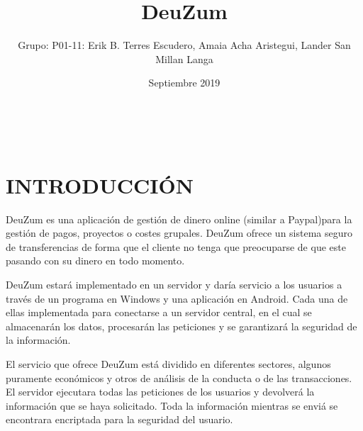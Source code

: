 \documentclass{article}
\title{ DeuZum}
\author{Grupo: P01-11: Erik B. Terres Escudero, Amaia Acha Aristegui, Lander San Millan Langa}
\date{Septiembre 2019}
\theoremstyle{definition}
\begin{document}

\hfill \break
\makeatletter

\hfil\parbox[t]{0.9\textwidth}{\centering\Huge\bfseries\@title}\par
\hfil\parbox[t]{0.7\textwidth}{\centering\bfseries\@author\\[1ex]\@date}\par


\makeatother

\hfill \break


\section{INTRODUCCIÓN}


DeuZum es una aplicación de gestión de dinero online (similar a Paypal)para la gestión de pagos, proyectos o costes grupales. DeuZum ofrece un sistema seguro de transferencias de forma que el cliente no tenga que preocuparse de que este pasando con su dinero en todo momento. 

DeuZum estará implementado en un servidor y daría servicio a los usuarios a través de un programa en Windows y una aplicación en Android. Cada una de ellas implementada para conectarse a un servidor central, en el cual se almacenarán los datos, procesarán las peticiones y se garantizará la seguridad de la información.

El servicio que ofrece DeuZum está dividido en diferentes sectores, algunos puramente económicos y otros de análisis de la conducta o de las transacciones. El servidor ejecutara todas las peticiones de los usuarios y devolverá la información que se haya solicitado. Toda la información mientras se enviá se encontrara encriptada para la seguridad del usuario.
\end{document}
